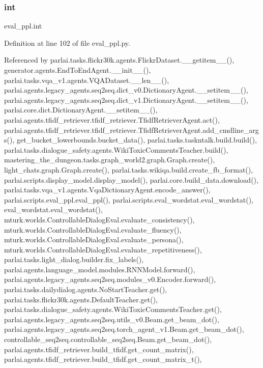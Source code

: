 \subsubsection{\texorpdfstring{int}{int}}
{\footnotesize\ttfamily eval\+\_\+ppl.\+int}



Definition at line 102 of file eval\+\_\+ppl.\+py.



Referenced by parlai.\+tasks.\+flickr30k.\+agents.\+Flickr\+Dataset.\+\_\+\+\_\+getitem\+\_\+\+\_\+(), generator.\+agents.\+End\+To\+End\+Agent.\+\_\+\+\_\+init\+\_\+\+\_\+(), parlai.\+tasks.\+vqa\+\_\+v1.\+agents.\+V\+Q\+A\+Dataset.\+\_\+\+\_\+len\+\_\+\+\_\+(), parlai.\+agents.\+legacy\+\_\+agents.\+seq2seq.\+dict\+\_\+v0.\+Dictionary\+Agent.\+\_\+\+\_\+setitem\+\_\+\+\_\+(), parlai.\+agents.\+legacy\+\_\+agents.\+seq2seq.\+dict\+\_\+v1.\+Dictionary\+Agent.\+\_\+\+\_\+setitem\+\_\+\+\_\+(), parlai.\+core.\+dict.\+Dictionary\+Agent.\+\_\+\+\_\+setitem\+\_\+\+\_\+(), parlai.\+agents.\+tfidf\+\_\+retriever.\+tfidf\+\_\+retriever.\+Tfidf\+Retriever\+Agent.\+act(), parlai.\+agents.\+tfidf\+\_\+retriever.\+tfidf\+\_\+retriever.\+Tfidf\+Retriever\+Agent.\+add\+\_\+cmdline\+\_\+args(), get\+\_\+bucket\+\_\+lowerbounds.\+bucket\+\_\+data(), parlai.\+tasks.\+taskntalk.\+build.\+build(), parlai.\+tasks.\+dialogue\+\_\+safety.\+agents.\+Wiki\+Toxic\+Comments\+Teacher.\+build(), mastering\+\_\+the\+\_\+dungeon.\+tasks.\+graph\+\_\+world2.\+graph.\+Graph.\+create(), light\+\_\+chats.\+graph.\+Graph.\+create(), parlai.\+tasks.\+wikiqa.\+build.\+create\+\_\+fb\+\_\+format(), parlai.\+scripts.\+display\+\_\+model.\+display\+\_\+model(), parlai.\+core.\+build\+\_\+data.\+download(), parlai.\+tasks.\+vqa\+\_\+v1.\+agents.\+Vqa\+Dictionary\+Agent.\+encode\+\_\+answer(), parlai.\+scripts.\+eval\+\_\+ppl.\+eval\+\_\+ppl(), parlai.\+scripts.\+eval\+\_\+wordstat.\+eval\+\_\+wordstat(), eval\+\_\+wordstat.\+eval\+\_\+wordstat(), mturk.\+worlds.\+Controllable\+Dialog\+Eval.\+evaluate\+\_\+consistency(), mturk.\+worlds.\+Controllable\+Dialog\+Eval.\+evaluate\+\_\+fluency(), mturk.\+worlds.\+Controllable\+Dialog\+Eval.\+evaluate\+\_\+persona(), mturk.\+worlds.\+Controllable\+Dialog\+Eval.\+evaluate\+\_\+repetitiveness(), parlai.\+tasks.\+light\+\_\+dialog.\+builder.\+fix\+\_\+labels(), parlai.\+agents.\+language\+\_\+model.\+modules.\+R\+N\+N\+Model.\+forward(), parlai.\+agents.\+legacy\+\_\+agents.\+seq2seq.\+modules\+\_\+v0.\+Encoder.\+forward(), parlai.\+tasks.\+dailydialog.\+agents.\+No\+Start\+Teacher.\+get(), parlai.\+tasks.\+flickr30k.\+agents.\+Default\+Teacher.\+get(), parlai.\+tasks.\+dialogue\+\_\+safety.\+agents.\+Wiki\+Toxic\+Comments\+Teacher.\+get(), parlai.\+agents.\+legacy\+\_\+agents.\+seq2seq.\+utils\+\_\+v0.\+Beam.\+get\+\_\+beam\+\_\+dot(), parlai.\+agents.\+legacy\+\_\+agents.\+seq2seq.\+torch\+\_\+agent\+\_\+v1.\+Beam.\+get\+\_\+beam\+\_\+dot(), controllable\+\_\+seq2seq.\+controllable\+\_\+seq2seq.\+Beam.\+get\+\_\+beam\+\_\+dot(), parlai.\+agents.\+tfidf\+\_\+retriever.\+build\+\_\+tfidf.\+get\+\_\+count\+\_\+matrix(), parlai.\+agents.\+tfidf\+\_\+retriever.\+build\+\_\+tfidf.\+get\+\_\+count\+\_\+matrix\+\_\+t(), 
